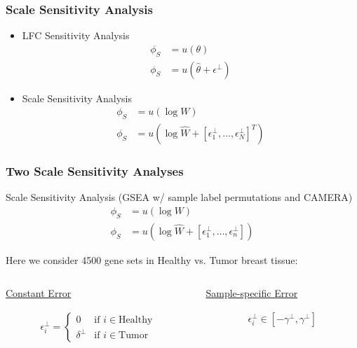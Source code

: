 \documentclass[11pt]{beamer}
\begin{document}
\begin{frame}
  \frametitle{Scale Sensitivity Analysis}

  \begin{itemize}
  \item LFC Sensitivity Analysis
    \begin{align*}
      \phi_S &= u(\theta) \\
      \phi_S &= u(\hat{\theta}+\epsilon^\perp)
    \end{align*}
  \item Scale Sensitivity Analysis
     \begin{align*}
      \phi_S &= u(\log W) \\
      \phi_S &= u(\log \hat{W}+ [\epsilon^\perp_1,\dots,\epsilon^\perp_N]^T)
    \end{align*}
   
  \end{itemize}
\end{frame}


\begin{frame}[t]
  \frametitle{Two Scale Sensitivity Analyses}

    Scale Sensitivity Analysis \color{gray} (GSEA w/ sample label permutations and CAMERA) \color{black}
    \begin{align*}
      \phi_S &= u(\log W) \\
      \phi_S &= u(\log \hat{W} + \left[\epsilon^\perp_1,\dots,\epsilon^\perp_n\right])
    \end{align*}

   Here we consider 4500 gene sets in Healthy vs. Tumor breast tissue:
   \begin{columns}
     \begin{column}{0.5\textwidth}
      \begin{center}
        \underline{Constant Error}

        \begin{align*}
          \epsilon^\perp_i = \begin{cases}
            0 & \text{if } i \in \text{Healthy} \\
            \delta^\perp & \text{if } i \in \text{Tumor}
          \end{cases}
        \end{align*}
      \end{center}
    \end{column}
    \vrule{}
    \begin{column}{0.5\textwidth}  %
      \vspace{5px}
      \begin{center}
        \underline{Sample-specific Error}
        
         \begin{align*}
          \epsilon^\perp_i \in [-\gamma^\perp,\gamma^\perp]
         \end{align*}
         \vspace{1px}
      \end{center}
    \end{column}
   \end{columns}
\end{frame}
\end{document}
